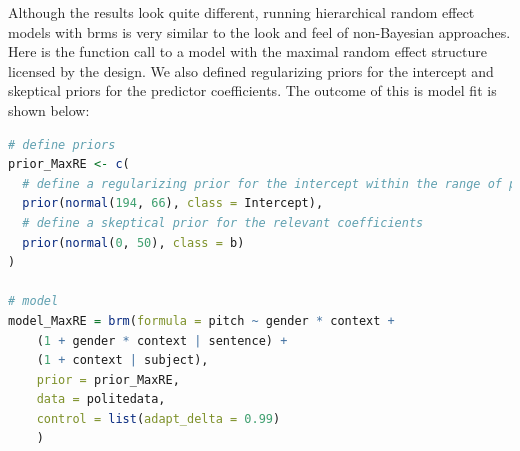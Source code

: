 \documentclass[nobib]{tufte-handout}
\begin{document}
Although the results look quite different, running hierarchical random effect models with \textrm{brms} is very similar to the look and feel of non-Bayesian approaches. Here is the function call to a model with the maximal random effect structure licensed by the design. We also defined regularizing priors for the intercept and skeptical priors for the predictor coefficients.
The outcome of this is model fit is shown below:

\begin{minipage}[]{1\textwidth}
\begin{lstlisting}[language=R]
# define priors
prior_MaxRE <- c(
  # define a regularizing prior for the intercept within the range of possible pitch values
  prior(normal(194, 66), class = Intercept),
  # define a skeptical prior for the relevant coefficients
  prior(normal(0, 50), class = b)
)

# model
model_MaxRE = brm(formula = pitch ~ gender * context +
	(1 + gender * context | sentence) +
	(1 + context | subject),
	prior = prior_MaxRE,
	data = politedata,
	control = list(adapt_delta = 0.99)
	)
\end{lstlisting}
\end{minipage}

\medskip
\end{document}
